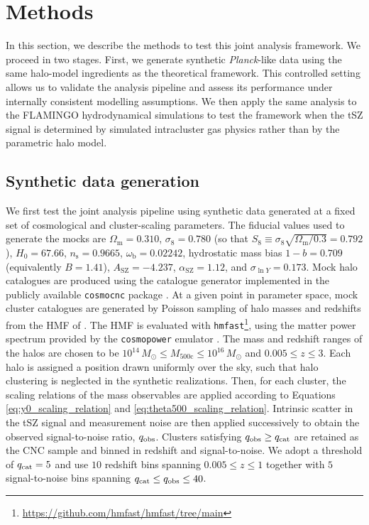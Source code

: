 \documentclass[aps,prd,twocolumn,superscriptaddress,nofootinbib,floatfix]{revtex4-2}
\begin{document}
\section{Methods}
\label{sec:methods}
In this section, we describe the methods to test this joint analysis framework. We proceed in two stages. First, we generate synthetic \textit{Planck}-like data using the same halo-model ingredients as the theoretical framework. This controlled setting allows us to validate the analysis pipeline and assess its performance under internally consistent modelling assumptions. We then apply the same analysis to the FLAMINGO hydrodynamical simulations to test the framework when the tSZ signal is determined by simulated intracluster gas physics rather than by the parametric halo model.

\subsection{Synthetic data generation}
\label{subsec:syntheticdata}
We first test the joint analysis pipeline using synthetic data generated at a fixed set of cosmological and cluster-scaling parameters.
The fiducial values used to generate the mocks are
$\Omega_{\mathrm{m}}=0.310$,
$\sigma_8=0.780$
(so that $S_8\equiv\sigma_8\sqrt{\Omega_{\mathrm{m}}/0.3}=0.792$),
$H_0=67.66$,
$n_{\mathrm{s}}=0.9665$,
$\omega_{\mathrm{b}}=0.02242$,
hydrostatic mass bias $1-b=0.709$ (equivalently $B=1.41$),
$A_{\mathrm{SZ}}=-4.237$,
$\alpha_{\mathrm{SZ}}=1.12$,
and $\sigma_{\ln Y}=0.173$.
Mock halo catalogues are produced using the catalogue generator implemented in the publicly available \texttt{cosmocnc} package \citep{ZubeldiaBolliet2024}. At a given point in parameter space, mock cluster catalogues are generated by Poisson sampling of halo masses and redshifts from the HMF of \citet{Tinker:2008ff}. The HMF is evaluated with \texttt{hmfast}\footnote{\url{https://github.com/hmfast/hmfast/tree/main}}, using the matter power spectrum provided by the \texttt{cosmopower} emulator \citep{SpurioMancini2022}. The mass and redshift ranges of the halos are chosen to be \(10^{14}\,M_\odot \leq M_{500\mathrm{c}} \leq 10^{16}\,M_\odot\) and \(0.005\leq z\leq3\). Each halo is assigned a position drawn uniformly over the sky, such that halo clustering is neglected in the synthetic realizations. Then, for each cluster, the scaling relations of the mass observables are applied according to Equations \ref{eq:y0_scaling_relation} and \ref{eq:theta500_scaling_relation}. Intrinsic scatter in the tSZ signal and measurement noise are then applied successively to obtain the observed signal-to-noise ratio, $q_{\rm obs}$. Clusters satisfying $q_{\rm obs}\ge q_{\rm cat}$ are retained as the CNC sample and binned in redshift and signal-to-noise. We adopt a threshold of $q_{\rm cat}=5$ and use $10$ redshift bins spanning $0.005\le z\le 1$ together with $5$ signal-to-noise bins spanning $q_{\rm cat}\le q_{\rm obs}\le 40$. 
\end{document}
